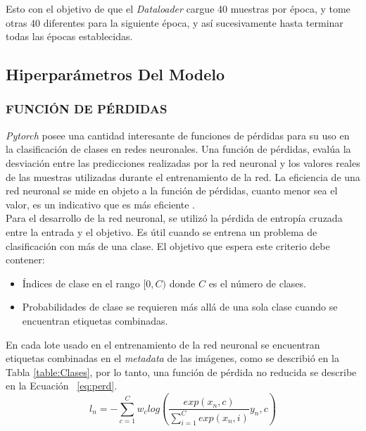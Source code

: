 Esto con el objetivo de que el \textit{Dataloader} cargue 40 muestras por época, y tome otras 40 diferentes para la siguiente época, y así sucesivamente hasta terminar todas las épocas establecidas.  


\subsection{Hiperparámetros Del Modelo}

\subsubsection{FUNCIÓN DE PÉRDIDAS}		

\textit{Pytorch} posee una cantidad interesante de funciones de pérdidas para su uso en la clasificación de clases en redes neuronales. Una función de pérdidas, evalúa la desviación entre las predicciones realizadas por la red neuronal y los valores reales de las muestras utilizadas durante el entrenamiento de la red. La eficiencia de una red neuronal se mide en objeto a la función de pérdidas, cuanto menor sea el valor, es un indicativo que es más eficiente \cite{mathivet2018inteligencia}.\\
 	
Para el desarrollo de la red neuronal, se utilizó la pérdida de entropía cruzada entre la entrada y el objetivo. Es útil cuando se entrena un problema de clasificación con más de una clase. El objetivo que espera este criterio debe contener:

\begin{itemize}
	\item Índices de clase en el rango $[0,C)$ donde $C$ es el número de clases.
	\item Probabilidades de clase se requieren más allá de una sola clase cuando se encuentran etiquetas combinadas.				 
\end{itemize}

En cada lote usado en el entrenamiento de la red neuronal se encuentran etiquetas combinadas en el \textit{metadata} de las imágenes, como se describió en la Tabla \ref{table:Clases}, por lo tanto, una función de pérdida no reducida \cite{Pytorch} se describe en la Ecuación ~\ref{eq:perd}.\\

\begin{equation}
	\label{eq:perd}
	{l_n=-\sum_{c=1}^{C}w_c log\left(\frac{exp(x_n,c)}{\sum_{i=1}^{C}exp(x_n,i)}y_n,c\right)}
\end{equation}\\

